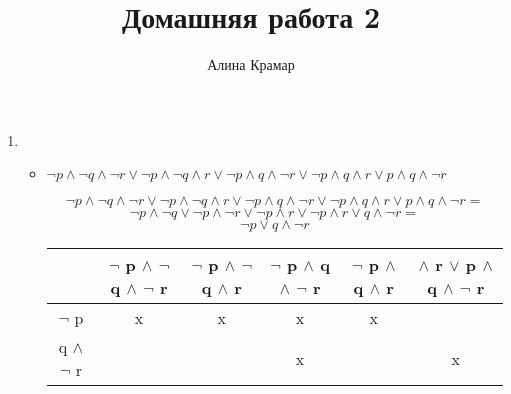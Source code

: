 \documentclass{article}
\begin{document}
\title{Домашняя работа 2}
\author{Алина Крамар}

\maketitle
\begin{enumerate}

\item
  \begin{itemize}
  \item $\neg p \land \neg q \land \neg r \lor \neg p \land \neg q
    \land r \lor \neg p \land q \land \neg r \lor \neg p \land q
    \land r \lor p \land q \land \neg r$

    $$\neg p \land \neg q \land \neg r \lor \neg p \land \neg q
    \land r \lor \neg p \land q \land \neg r \lor \neg p \land q
    \land r \lor p \land q \land \neg r =$$ $$\neg p \land \neg q \lor
    \neg p \land \neg r \lor \neg p \land r \lor \neg p \land r \lor q
    \land \neg r =$$ $$\neg p \lor q \land \neg r$$

\begin{tabular}{|c|c|c|c|c|c|}
\hline
 & $\neg{}$ p $\land$ $\neg{}$ q $\land$ $\neg{}$ r & $\neg{}$ p $\land$ $\neg{}$ q $\land$ r & $\neg{}$ p $\land$ q $\land$ $\neg{}$ r & $\neg{}$ p $\land$ q $\land$ r & $\land$ r $\lor$ p $\land$ q $\land$ $\neg{}$ r \\
\hline
$\neg{}$ p & x & x & x & x &  \\
\hline
q $\land$ $\neg{}$ r &  &  & x &  & x \\
\hline
\end{tabular}

\begin{comment}
#+ORGTBL: SEND foobar orgtbl-to-latex :splice t :skip 0
  |----------------+----------------------------------+-----------------------------+-----------------------------+------------------------+-------------------------------------|
  |                | \neg p \land \neg q \land \neg r | \neg p \land \neg q \land r | \neg p \land q \land \neg r | \neg p \land q \land r | \land r \lor p \land q \land \neg r |
  |----------------+----------------------------------+-----------------------------+-----------------------------+------------------------+-------------------------------------|
  | \neg p         | x                                | x                           | x                           | x                      |                                     |
  |----------------+----------------------------------+-----------------------------+-----------------------------+------------------------+-------------------------------------|
  | q \land \neg r |                                  |                             | x                           |                        | x                                   |
  |----------------+----------------------------------+-----------------------------+-----------------------------+------------------------+-------------------------------------|


\end{comment}
\end{itemize}
\end{enumerate}
\end{document}
